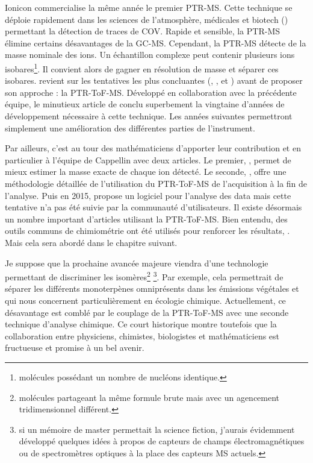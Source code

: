 \documentclass[
  12pt,
  american,
  a4paper,
  extrafontsizes,onecolumn,openright
  ]{memoir}
\begin{document}
Ionicon commercialise la même année le premier PTR-MS. Cette technique se déploie rapidement dans les sciences de l'atmosphère, médicales et biotech (\autocite{babcock_2001}) permettant la détection de traces de COV. Rapide et sensible, la PTR-MS élimine certains désavantages de la GC-MS. Cependant, la PTR-MS détecte de la masse nominale des ions. Un échantillon complexe peut contenir plusieurs ions isobares\footnote{molécules possédant un nombre de nucléons identique.}. Il convient alors de gagner en résolution de masse et séparer ces isobares. \autocite{jordan_2009} revient sur les tentatives les plus concluantes (\autocite{blake_2004}, \autocite{ennis_2005}, \autocite{inomata_2006} et \autocite{tanimoto_2007} ) avant de proposer son approche : la PTR-ToF-MS. Développé en collaboration avec la précédente équipe, le minutieux article de \autocite{graus_2010} conclu superbement la vingtaine d'années de développement nécessaire à cette technique. Les années suivantes permettront simplement une amélioration des différentes parties de l'instrument.

Par ailleurs, c'est au tour des mathématiciens d'apporter leur contribution et en particulier à l'équipe de Cappellin avec deux articles. Le premier, \autocite{cappellin_2010}, permet de mieux estimer la masse exacte de chaque ion détecté. Le seconde, \autocite{cappellin_2011}, offre une méthodologie détaillée de l'utilisation du PTR-ToF-MS de l'acquisition à la fin de l'analyse. Puis en 2015, \autocite{holzinger_2015} propose un logiciel pour l'analyse des data mais cette tentative n'a pas été suivie par la communauté d'utilisateurs. Il existe désormais un nombre important d'articles utilisant la PTR-ToF-MS. Bien entendu, des outils communs de chimiométrie ont été utilisés pour renforcer les résultats, \autocite{deuscher_2019}. Mais cela sera abordé dans le chapitre suivant.

Je suppose que la prochaine avancée majeure viendra d'une technologie permettant de discriminer les isomères\footnote{molécules partageant la même formule brute mais avec un agencement tridimensionnel différent.} \autocite{amt-14-133-2021} \footnote{si un mémoire de master permettait la science fiction, j'aurais évidemment développé quelques idées à propos de capteurs de champs électromagnétiques ou de spectromètres optiques à la place des capteurs MS actuels.}. Par exemple, cela permettrait de séparer les différents monoterpènes omniprésents dans les émissions végétales et qui nous concernent particulièrement en écologie chimique. Actuellement, ce désavantage est comblé par le couplage de la PTR-ToF-MS avec une seconde technique d'analyse chimique. Ce court historique montre toutefois que la collaboration entre physiciens, chimistes, biologistes et mathématiciens est fructueuse et promise à un bel avenir.
\end{document}
